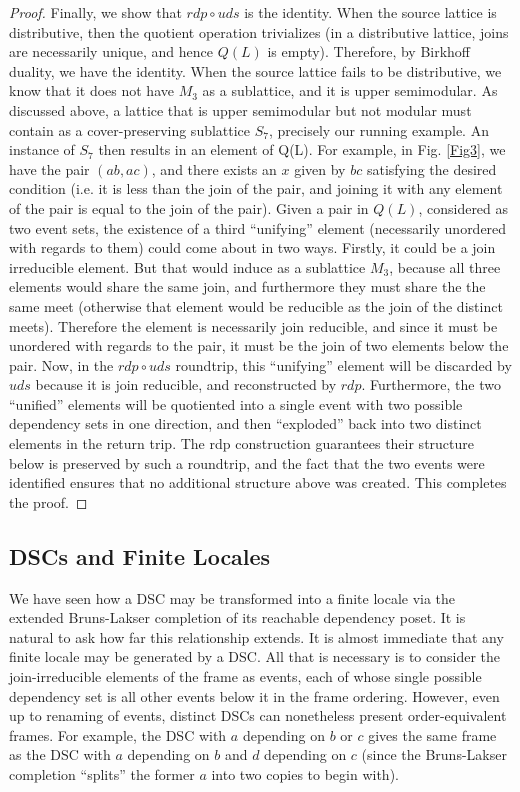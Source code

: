\documentclass[hoptionsi,review,screen,format=sigconf]{acmart}
\theoremstyle{definition}
\begin{document}
\begin{proof}
Finally, we show that \(rdp \circ uds\) is the identity. When the source lattice is distributive, then the quotient operation trivializes (in a distributive lattice, joins are necessarily unique, and hence \(Q(L)\) is empty). Therefore, by Birkhoff duality, we have the identity. When the source lattice fails to be distributive, we know that it does not have \(M_3\) as a sublattice, and it is upper semimodular. As discussed above, a lattice that is upper semimodular but not modular must contain as a cover-preserving sublattice \(S_7\), precisely our running example. An instance of \(S_7\) then results in an element of Q(L). For example, in Fig. \ref{Fig3},  we have the pair \((ab,ac)\), and there exists an \(x\) given by \(bc\) satisfying the desired condition (i.e. it is less than the join of the pair, and joining it with any element of the pair is equal to the join of the pair). Given a pair in \(Q(L)\), considered as two event sets, the existence of a third ``unifying'' element (necessarily unordered with regards to them) could come about in two ways. Firstly, it could be a join irreducible element. But that would induce as a sublattice \(M_3\), because all three elements would share the same join, and furthermore they must share the the same meet (otherwise that element would be reducible as the join of the distinct meets). Therefore the element is necessarily join reducible, and since it must be unordered with regards to the pair, it must be the join of two elements below the pair. Now, in the \(rdp \circ uds\) roundtrip, this ``unifying'' element will be discarded by \(uds\) because it is join reducible, and reconstructed by \(rdp\). Furthermore, the two ``unified'' elements will be quotiented into a single event with two possible dependency sets in one direction, and then ``exploded'' back into two distinct elements in the return trip. The rdp construction guarantees their structure below is preserved by such a roundtrip, and the fact that the two events were identified ensures that no additional structure above was created. This completes the proof.
\end{proof}

\subsection{DSCs and Finite Locales}

We have seen how a DSC may be transformed into a finite locale via the extended Bruns-Lakser completion of its reachable dependency poset. It is natural to ask how far this relationship extends. It is almost immediate that any finite locale may be generated by a DSC. All that is necessary is to consider the join-irreducible elements of the frame as events, each of whose single possible dependency set is all other events below it in the frame ordering. However, even up to renaming of events, distinct DSCs can nonetheless present order-equivalent frames. For example, the DSC with \(a\) depending on \(b\) or \(c\) gives the same frame as the DSC with \(a\) depending on \(b\) and \(d\) depending on \(c\) (since the Bruns-Lakser completion ``splits'' the former \(a\) into two copies to begin with). 
\end{document}

